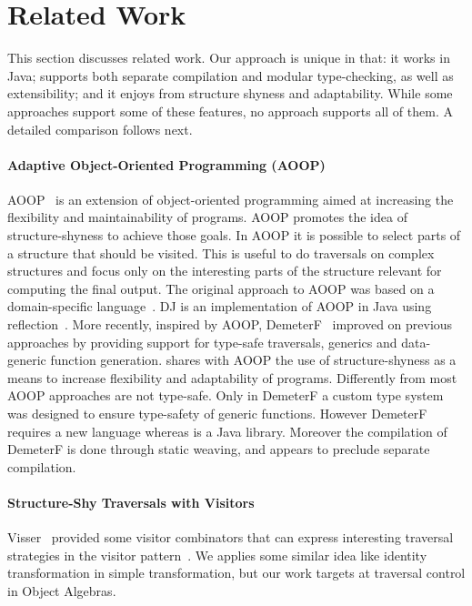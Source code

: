\section{Related Work}\label{sec:related}


This section discusses related work. Our approach is unique in that: 
it works in Java; supports both separate compilation and modular 
type-checking, as well as extensibility; and it enjoys from structure 
shyness and adaptability. While some approaches support some of these 
features, no approach supports all of them. A detailed comparison
follows next.

\paragraph{Adaptive Object-Oriented Programming (AOOP)}
AOOP~\cite{DemeterBook} is an extension of object-oriented programming
aimed at increasing the flexibility and maintainability of
programs. AOOP promotes the idea of structure-shyness to achieve those
goals. In AOOP it is possible to select parts of a structure that
should be visited. This is useful to do traversals on complex
structures and focus only on the interesting parts of the structure
relevant for computing the final output. The original approach to AOOP
was based on a domain-specific language~\cite{DemeterBook}. DJ is an
implementation of AOOP in Java using reflection~\cite{DJ}. More
recently, inspired by AOOP, DemeterF~\cite{OOGP} improved on previous
approaches by providing support for type-safe traversals, generics and
data-generic function generation. \name shares with AOOP the use of
structure-shyness as a means to increase flexibility and adaptability
of programs.  Differently from \name most AOOP approaches are not
type-safe. Only in DemeterF a custom type system was designed to
ensure type-safety of generic functions. However DemeterF requires a
new language whereas \name is a Java library. Moreover the compilation
of DemeterF is done through static weaving, and appears to preclude
separate compilation.

\paragraph{Structure-Shy Traversals with Visitors}
Visser~\cite{visser01visitor} provided some visitor
combinators that can express interesting traversal strategies in the
{\sc visitor} pattern~\cite{gof}. We applies some similar idea like identity
transformation in simple transformation, but our work targets at
traversal control in Object Algebras.

